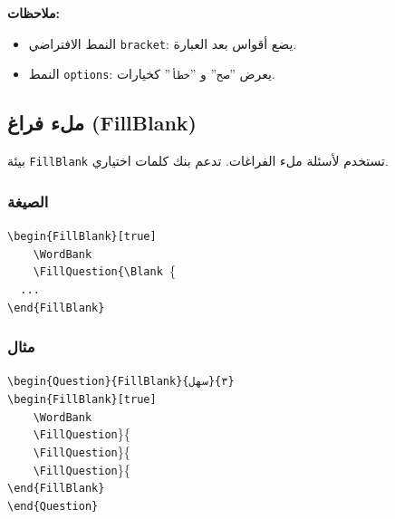\documentclass[a4paper]{article}
\newcommand{\engtt}[1]{\textenglish{\texttt{#1}}}
\begin{document}
\textbf{ملاحظات:}
\begin{itemize}
    \item النمط الافتراضي \engtt{bracket}: يضع أقواس بعد العبارة.
    \item النمط \engtt{options}: يعرض ''\texttt{صح}'' و ''\texttt{خطأ}'' كخيارات.
\end{itemize}

\subsection{ملء فراغ (FillBlank)}

بيئة \engtt{FillBlank} تستخدم لأسئلة ملء الفراغات. تدعم بنك كلمات اختياري.

\subsubsection*{الصيغة}

\begin{LTR}\ttfamily
\verb|\begin{FillBlank}[true]|\\
\verb|    \WordBank|\\
\verb|    \FillQuestion{\Blank |\{\\
\verb|  ...|\\
\verb|\end{FillBlank}|
\end{LTR}

\subsubsection*{مثال}

\begin{LTR}\ttfamily
\verb|\begin{Question}{FillBlank}{سهل}{٣}|\\
\verb|\begin{FillBlank}[true]|\\
\verb|    \WordBank|\\
\verb|    \FillQuestion|\}\{\\
\verb|    \FillQuestion|\}\{\\
\verb|    \FillQuestion|\}\{\\
\verb|\end{FillBlank}|\\
\verb|\end{Question}|
\end{LTR}
\end{document}

